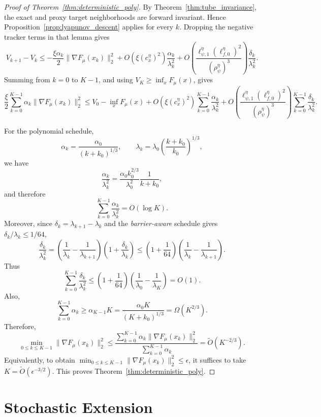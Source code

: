\documentclass{article}
\begin{document}
\begin{proof}[Proof of Theorem~\ref{thm:deterministic_poly}]
By Theorem~\ref{thm:tube_invariance}, the exact and proxy target neighborhoods are forward invariant.
Hence Proposition~\ref{prop:lyapunov_descent} applies for every \(k\). Dropping the negative
tracker terms in that lemma gives
\[
V_{k+1}-V_k
\le
-\frac{\xi\alpha_k}{2}\|\nabla F_\mu(x_k)\|_2^2
+
O\!\left(\xi(c_x^\eta)^2\right)\frac{\alpha_k}{\lambda_k^2}
+
O\!\left(\frac{\ell_{\psi,1}^\eta(\ell_{f,0}^\eta)^2}{(\rho_\psi^\eta)^3}\right)
\frac{\delta_k}{\lambda_k^2}.
\]
Summing from \(k=0\) to \(K-1\), and using \(V_K\ge \inf_x F_\mu(x)\), gives
\[
\frac{\xi}{2}
\sum_{k=0}^{K-1}\alpha_k\|\nabla F_\mu(x_k)\|_2^2
\le
V_0-\inf_x F_\mu(x)
+
O\!\left(\xi(c_x^\eta)^2\right)
\sum_{k=0}^{K-1}\frac{\alpha_k}{\lambda_k^2}
+
O\!\left(\frac{\ell_{\psi,1}^\eta(\ell_{f,0}^\eta)^2}{(\rho_\psi^\eta)^3}\right)
\sum_{k=0}^{K-1}\frac{\delta_k}{\lambda_k^2}.
\]

For the polynomial schedule,
\[
\alpha_k=\frac{\alpha_0}{(k+k_0)^{1/3}},
\qquad
\lambda_k=\lambda_0\left(\frac{k+k_0}{k_0}\right)^{1/3},
\]
we have
\[
\frac{\alpha_k}{\lambda_k^2}
=
\frac{\alpha_0 k_0^{2/3}}{\lambda_0^2}\frac{1}{k+k_0},
\]
and therefore
\[
\sum_{k=0}^{K-1}\frac{\alpha_k}{\lambda_k^2}
=
O(\log K).
\]
Moreover, since \(\delta_k=\lambda_{k+1}-\lambda_k\) and the \textit{barrier-aware} schedule gives
\(\delta_k/\lambda_k\le 1/64\),
\[
\frac{\delta_k}{\lambda_k^2}
=
\left(\frac1{\lambda_k}-\frac1{\lambda_{k+1}}\right)
\left(1+\frac{\delta_k}{\lambda_k}\right)
\le
\left(1+\frac1{64}\right)
\left(\frac1{\lambda_k}-\frac1{\lambda_{k+1}}\right).
\]
Thus
\[
\sum_{k=0}^{K-1}\frac{\delta_k}{\lambda_k^2}
\le
\left(1+\frac1{64}\right)
\left(\frac1{\lambda_0}-\frac1{\lambda_K}\right)
=
O(1).
\]
Also,
\[
\sum_{k=0}^{K-1}\alpha_k
\ge
\alpha_{K-1}K
=
\frac{\alpha_0K}{(K+k_0)^{1/3}}
=
\Omega(K^{2/3}).
\]
Therefore,
\[
\min_{0\le k\le K-1}\|\nabla F_\mu(x_k)\|_2^2
\le
\frac{\sum_{k=0}^{K-1}\alpha_k\|\nabla F_\mu(x_k)\|_2^2}
{\sum_{k=0}^{K-1}\alpha_k}
=
\widetilde O(K^{-2/3}).
\]
Equivalently, to obtain
\(\min_{0\le k\le K-1}\|\nabla F_\mu(x_k)\|_2^2\le \epsilon\), it suffices to take
\(K=\widetilde O(\epsilon^{-3/2})\). This proves Theorem~\ref{thm:deterministic_poly}.
\end{proof}

\section{Stochastic Extension}
\label{app:stochastic_proofs}
\end{document}
